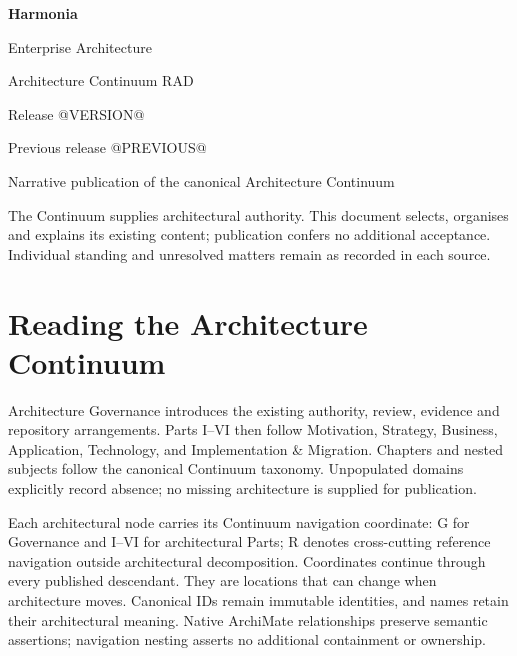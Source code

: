 \documentclass[10pt,a4paper,oneside,headings=small]{scrreprt}
\begin{document}
\hypersetup{pageanchor=false}
\begin{titlepage}
\vspace*{24mm}
{\Huge\bfseries\color{Ink} Harmonia\par}
\vspace{8mm}
{\LARGE Enterprise Architecture\par Architecture Continuum RAD\par}
\vspace{12mm}
{\Large Release @VERSION@\par Previous release @PREVIOUS@\par}
\vfill
Narrative publication of the canonical Architecture Continuum\par
\vspace{8mm}
The Continuum supplies architectural authority. This document selects, organises
and explains its existing content; publication confers no additional acceptance.
Individual standing and unresolved matters remain as recorded in each source.
\end{titlepage}
\hypersetup{pageanchor=true}
\tableofcontents
\chapter*{Reading the Architecture Continuum}
Architecture Governance introduces the existing authority, review, evidence and
repository arrangements. Parts I--VI then follow Motivation, Strategy, Business,
Application, Technology, and Implementation \& Migration. Chapters and nested
subjects follow the canonical Continuum taxonomy. Unpopulated domains explicitly
record absence; no missing architecture is supplied for publication.

Each architectural node carries its Continuum navigation coordinate: G for
Governance and I--VI for architectural Parts; R denotes cross-cutting reference
navigation outside architectural decomposition. Coordinates continue through every
published descendant. They are locations that can change when architecture moves.
Canonical IDs remain immutable identities, and names retain their architectural
meaning. Native ArchiMate relationships preserve semantic assertions; navigation
nesting asserts no additional containment or ownership.
\end{document}
